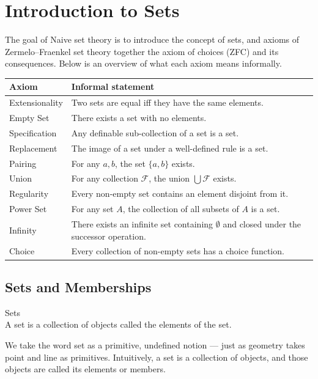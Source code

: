 \documentclass[a4paper]{article}
\begin{document}
\pagebreak
\section{Introduction to Sets}
The goal of Naive set theory is to introduce the concept of sets, and axioms of Zermelo–Fraenkel set theory together the axiom of choices (ZFC) and its consequences. Below is an overview of what each axiom means informally. 

\begin{center}
\begin{tabular}{@{}lp{9.5cm}@{}}
  \toprule
  \textbf{Axiom} & \textbf{Informal statement} \\
  \midrule
  Extensionality & Two sets are equal iff they have the same elements. \\
  Empty Set      & There exists a set with no elements. \\
  Specification     & Any definable sub-collection of a set is a set. \\
  Replacement    & The image of a set under a well-defined rule is a set. \\
  Pairing        & For any $a,b$, the set $\{a,b\}$ exists. \\
  Union          & For any collection $\mathcal{F}$, the union $\bigcup\mathcal{F}$ exists. \\
  Regularity     & Every non-empty set contains an element disjoint from it. \\
  Power Set      & For any set $A$, the collection of all subsets of $A$ is a set. \\
  Infinity       & There exists an infinite set containing $\emptyset$ and closed under the successor operation. \\
  Choice         & Every collection of non-empty sets has a choice function. \\
  \bottomrule
\end{tabular}
\end{center}

\subsection{Sets and Memberships}
\begin{defn}{Sets}{}\\
A set is a collection of objects called the elements of the set. 
\end{defn}

We take the word set as a primitive, undefined notion — just as geometry takes point and line as primitives. Intuitively, a set is a collection of objects, and those objects are called its elements or members. \\
\end{document}
